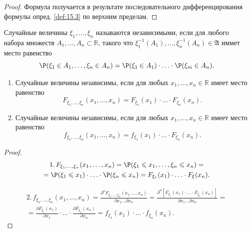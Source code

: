 \begin{proof}
	Формула получается в результате последовательного дифференцирования формулы опред. \ref{def:15.3} по верхним пределам.
\end{proof}

\begin{definition}
	Случайные величины $\xi_1, \dots, \xi_n$ называются независимыми, если для любого набора множеств $A_1,\dots ,A_n \subset \mathbb{R}$, такого что\newline
 	$\xi_1^{-1}(A_1), \dots, \xi_n^{-1}(A_n)\in\mathfrak{A}$ иммет место равенство
 	\begin{equation*}
 		\P(\xi_1\in A_1,\dots,\xi_n\in A_n)=\P(\xi_1 \in A_1)\cdot\ldots\cdot\P(\xi_m\in A_n).
 	\end{equation*}
\end{definition}
 \begin{lemma}
 \begin{enumerate}
 	\item Случайные величины независимы, если для любых $x_1,\dots, x_n \in \mathbb{R}$ имеет место равенство
 	\begin{equation*}
 		F_{\xi_1, \dots, \xi_n}(x_1,\dots,x_n)=F_{\xi_1}(x_1)\cdot\ldots\cdot F_{\xi_n}(x_n).
 	\end{equation*}
 	\item Случайные величины независимы, если для любых $x_1,\ldots,x_n\in\mathbb{R}$ имеет место равенство
 	\begin{equation*}
		f_{\xi_1, \dots, \xi_n}(x_1,\dots,x_n)=f_{\xi_1}(x_1)\cdot\ldots\cdot F_{\xi_n}(x_n). 		
 	\end{equation*}
 \end{enumerate}
\end{lemma}

\begin{proof}
	\begin{gather*}
	1. \,F_{\xi_1, \dots, \xi_n}(x_1,\dots,x_n)=\P(\xi_1\leqslant x_1,\ldots,\xi_n
	\leqslant x_n)=\\=
	\P(\xi_1\leqslant x_1)\cdot\ldots\cdot\P(\xi_n\leqslant x_n)=F_{\xi_1}(x_1)\cdot\ldots\cdot F_{\xi}(x_n).
	\end{gather*}	

	
	\begin{gather*}
	2. \,f_{\xi_1,\ldots,\xi_n}(x_1,\ldots,x_n)=
		\frac
		{\partial^nF_{\xi_1, \dots, \xi_n}(x_1,\dots,x_n)}
		{\partial x_1\ldots \partial x_n}=
		\frac
		{\partial^n\left[F_{\xi_1}(x_1)\cdot\ldots\cdot F_{\xi_n}(x_n)\right]}
		{\partial x_1\ldots \partial x_n}=\\=
		\frac{\partial F_{\xi_1}(x_1)}{\partial x_1}\cdot\ldots\cdot
		\frac{\partial F_{\xi_n}(x_n)}{\partial x_n}=f_{\xi_1}(x_1)\cdot\ldots\cdot f_{\xi_n}(x_n).
	\end{gather*}
\end{proof}

